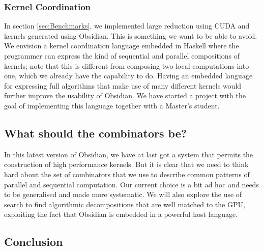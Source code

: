 \subsubsection{Kernel Coordination} 

In section \ref{sec:Benchmarks}, we implemented large reduction using 
CUDA and kernels generated using Obsidian. This is something we want to 
be able to avoid. We envision a kernel coordination language embedded 
in Haskell where the programmer can express the kind of sequential 
and parallel compositions of kernels; note that this is different from 
composing two local computations into one, which we already have the 
capability to do. Having an embedded language for expressing full 
algorithms that make use of many different kernels would further 
improve the usability of Obsidian. We have started a project with the 
goal of implementing this language together with a Master's student. 


\subsection{What should the combinators be?}
In this latest version of Obsidian, we have at last got a system
that permits the construction of high performance kernels. But it is
clear that we need to think hard about the set of combinators that
we use to describe common patterns of parallel and sequential computation.
Our current choice is a bit ad hoc and needs to be generalised and made
more systematic. We will also explore the use of search to find algorithmic 
decompositions that are well matched to the GPU, exploiting the fact 
that Obsidian is embedded in a powerful host language.

\subsection{Conclusion}

